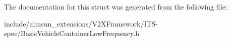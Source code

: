 The documentation for this struct was generated from the following file\+:\begin{DoxyCompactItemize}
\item 
include/aimsun\+\_\+extensions/\+V2\+X\+Framework/\+I\+T\+S-\/spec/Basic\+Vehicle\+Container\+Low\+Frequency.\+h\end{DoxyCompactItemize}
